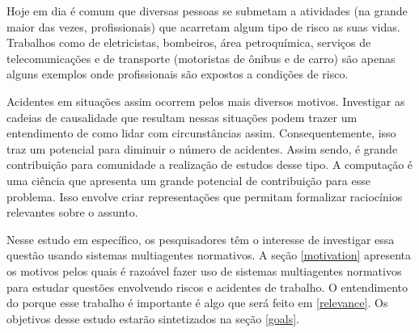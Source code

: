 Hoje em dia é comum que diversas pessoas se submetam a atividades (na grande maior das vezes, profissionais) que acarretam algum tipo de risco as suas vidas. Trabalhos como de eletricistas, bombeiros, área petroquímica, serviços de telecomunicações e de transporte (motoristas de ônibus e de carro) são apenas alguns exemplos onde profissionais são  expostos a condições de risco.

Acidentes em situações assim ocorrem pelos mais diversos motivos. Investigar as cadeias de causalidade que resultam nessas situações podem trazer um entendimento de como lidar com circunstâncias assim. Consequentemente, isso traz um potencial para diminuir o número de acidentes. Assim sendo, é grande contribuição para comunidade a realização de estudos desse tipo. A computação é uma ciência que apresenta um grande potencial de contribuição para esse problema. Isso envolve criar representações que permitam formalizar raciocínios relevantes sobre o assunto.

Nesse estudo em específico, os pesquisadores têm o interesse de investigar essa questão usando sistemas multiagentes normativos. A seção \ref{motivation} apresenta os motivos pelos quais é razoável fazer uso de sistemas multiagentes normativos para estudar questões envolvendo riscos e acidentes de trabalho. O entendimento do porque 
esse trabalho é importante é algo que será feito em \ref{relevance}. Os objetivos desse estudo estarão sintetizados na seção \ref{goals}.